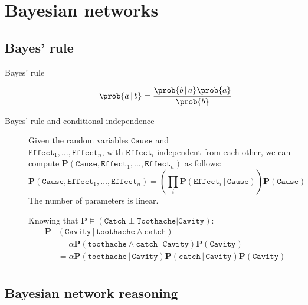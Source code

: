 \chapter{Bayesian networks}


\section{Bayes' rule}

\begin{description}
    \item[Bayes' rule] 
        \[ \prob{a \,\vert\, b} = \frac{\prob{b \,\vert\, a} \prob{a}}{\prob{b}} \]

    \item[Bayes' rule and conditional independence]
        Given the random variables $\texttt{Cause}$ and\\
        $\texttt{Effect}_1, \dots, \texttt{Effect}_n$, with $\texttt{Effect}_i$ independent from each other,
        we can compute $\textbf{P}(\texttt{Cause}, \texttt{Effect}_1, \dots, \texttt{Effect}_n)$ as follows:
        \[ 
            \textbf{P}(\texttt{Cause}, \texttt{Effect}_1, \dots, \texttt{Effect}_n) = 
            \left(\prod_i \textbf{P}(\texttt{Effect}_i \,\vert\, \texttt{Cause})\right) \textbf{P}(\texttt{Cause})
        \]
        The number of parameters is linear.

        \begin{example}
            Knowing that $\textbf{P} \models (\texttt{Catch} \perp \texttt{Toothache} \vert \texttt{Cavity})$:
            \[
                \begin{split}
                    \textbf{P}&(\texttt{Cavity} \,\vert\, \texttt{toothache} \land \texttt{catch}) \\
                        &= \alpha\textbf{P}(\texttt{toothache} \land \texttt{catch} \,\vert\, \texttt{Cavity})\textbf{P}(\texttt{Cavity}) \\
                        &= \alpha\textbf{P}(\texttt{toothache} \,\vert\, \texttt{Cavity})
                            \textbf{P}(\texttt{catch} \,\vert\, \texttt{Cavity})\textbf{P}(\texttt{Cavity}) \\
                \end{split}
            \]
        \end{example}
\end{description}


\section{Bayesian network reasoning}

